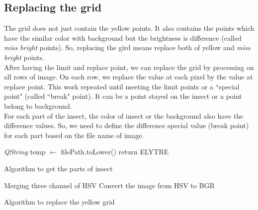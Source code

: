 \subsection{Replacing the grid}
The grid does not just contain the yellow points. It also contains the points which have the similar color with background but the brightness is difference (called \textit{miss bright} points). So, replacing the gird means replace both of yellow and \textit{miss bright} points.\\
After having the limit and replace point, we can replace the grid by processing on all rows of image. On each row, we replace the value at each pixel by the value at replace point. This work repeated until meeting the limit points or a ``special point" (called ``break" point). It can be a point stayed on the insect or a point belong to background.\\
For each part of the insect, the color of insect or the background also have the difference values. So, we need to define the difference special value (break point) for each part based on the file name of image.\\
\IncMargin{1em}
\begin{algorithm}[H]
\Indm
{}
\Indp
\textit{QString} temp $\leftarrow$ filePath.toLower()\;
return ELYTRE\;
\caption{Algorithm to get the parts of insect}
\end{algorithm}
\DecMargin{1em}
\IncMargin{1em}
\begin{algorithm}[H]
\Indm
{}
\Indp
{}
Merging three channel of HSV\;
Convert the image from HSV to BGR\;
\caption{Algorithm to replace the yellow grid}
\end{algorithm}
